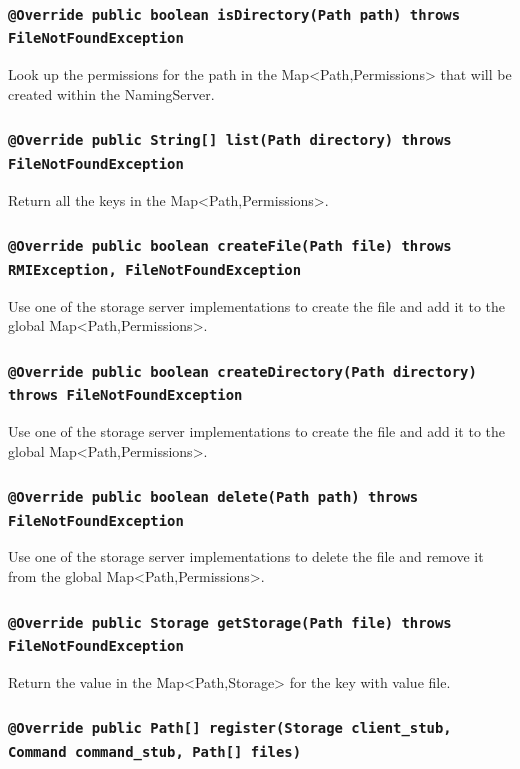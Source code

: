 \documentclass [10pt, a4paper]{article}
\begin{document}
\subsubsection{\texttt{@Override public boolean isDirectory(Path path) throws
FileNotFoundException}}
Look up the permissions for the path in the Map<Path,Permissions> that will be
created within the NamingServer.

\subsubsection{\texttt{@Override public String[] list(Path directory) throws
FileNotFoundException}}
Return all the keys in the Map<Path,Permissions>.

\subsubsection{\texttt{@Override public boolean createFile(Path file) throws
RMIException, FileNotFoundException}}
Use one of the storage server implementations to create the file and add it to
the global Map<Path,Permissions>.

\subsubsection{\texttt{@Override public boolean createDirectory(Path directory)
throws FileNotFoundException}}
Use one of the storage server implementations to create the file and add it to
the global Map<Path,Permissions>.

\subsubsection{\texttt{@Override public boolean delete(Path path) throws
FileNotFoundException}}
Use one of the storage server implementations to delete the file and remove it
from the global Map<Path,Permissions>.

\subsubsection{\texttt{@Override public Storage getStorage(Path file) throws
FileNotFoundException}}
Return the value in the Map<Path,Storage> for the key with value file.

\subsubsection{\texttt{@Override public Path[] register(Storage client\_stub,
Command command\_stub, Path[] files)}}
\end{document}
